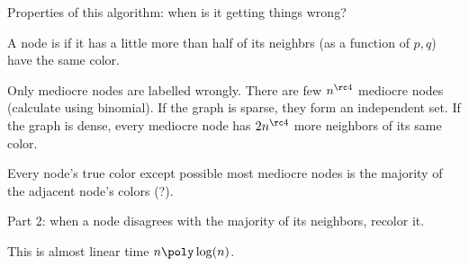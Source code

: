 Properties of this algorithm: when is it getting things wrong? 
\begin{df}
A node is  if it has a little more than half of its neighbrs (as a function of $p,q$) have the same color.
\end{df}
Only mediocre nodes are labelled wrongly. There are few $n^{\rc 4}$ mediocre nodes (calculate using binomial). 
If the graph is sparse, they form an independent set. If the graph is dense, every mediocre node has $2n^{\rc 4}$ more neighbors of its same color.

\begin{cor}
Every node's true color except possible most mediocre nodes is the majority of the adjacent node's colors (?).
\end{cor}

Part 2: when a node disagrees with the majority of its neighbors, recolor it.

This is almost linear time $n\poly\log(n)$. 
